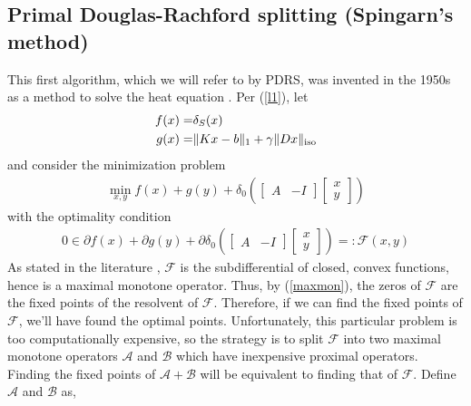 \documentclass{article}
\theoremstyle{definition}
\theoremstyle{remark}
\begin{document}
\subsection{Primal Douglas-Rachford splitting (Spingarn's method)}%
  \label{sub:PDRS}
  This first algorithm, which we will refer to by PDRS, was invented in the 1950s as a method to solve the heat equation \cite{douglas_rachford_1956}. Per (\ref{l1}), let 
  \begin{equation}\label{gf}
    \begin{split}
      f(x) =& \delta_S(x)\\ 
      g(x) =& \|Kx - b\|_1 + \gamma \|Dx\|_{\operatorname{{iso}}}
    \end{split}
  \end{equation}
  and consider the minimization problem 
  \begin{equation}
    \begin{split}
      \min_{x,y} f(x) + g(y) +\delta_0 \left( \begin{bmatrix}
        A & -I
      \end{bmatrix} \begin{bmatrix}
        x\\y
      \end{bmatrix} \right)
    \end{split}
  \end{equation}
  with the optimality condition 
  \begin{equation*}
    \begin{split}
      0 \in \partial f(x) + \partial g(y) + \partial \delta_0 \left( \begin{bmatrix}
        A & -I
      \end{bmatrix} \begin{bmatrix}
        x\\y
      \end{bmatrix} \right) =: \mathcal{F}(x,y) 
    \end{split}
  \end{equation*}
  As stated in the literature \cite{ConnorVander}, $\mathcal{F}$ is the subdifferential of closed, convex functions, hence is a maximal monotone operator. Thus, by (\ref{maxmon}), the zeros of $\mathcal{F}$ are the fixed points of the resolvent of $\mathcal{F}$. Therefore, if we can find the fixed points of $\mathcal{F}$, we'll have found the optimal points. Unfortunately, this particular problem is too computationally expensive, so the strategy is to split $\mathcal{F}$ into two maximal monotone operators $\mathcal{A}$ and $\mathcal{B}$ which have inexpensive proximal operators. Finding the fixed points of $\mathcal{A}+ \mathcal{B}$ will be equivalent to finding that of $\mathcal{F}.$ Define $\mathcal{A}$ and $\mathcal{B}$ as, 
\end{document}
